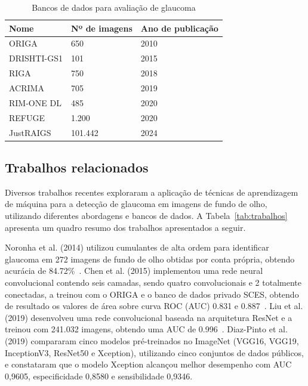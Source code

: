 \documentclass[12pt]{article}
\begin{document}
\begin{table}[htb]
    \centering
    \begin{tabularx}{\textwidth}{XXX}
    \toprule
    \textbf{Nome} & \textbf{Nº de imagens} & \textbf{Ano de publicação} \\
    \midrule
    ORIGA & 650 & 2010 \\
    DRISHTI-GS1 & 101 & 2015 \\
    RIGA & 750 & 2018 \\
    ACRIMA & 705 & 2019 \\
    RIM-ONE DL & 485 & 2020 \\
    REFUGE & 1.200 & 2020 \\
    JustRAIGS & 101.442 & 2024 \\
    \bottomrule
    \end{tabularx}
    \caption{Bancos de dados para avaliação de glaucoma}
    \label{tab:datasets}
\end{table}

\subsection{Trabalhos relacionados}
\label{sec:review:related}

Diversos trabalhos recentes exploraram a aplicação de técnicas de aprendizagem de máquina para a detecção de glaucoma em imagens de fundo de olho, utilizando diferentes abordagens e bancos de dados. A Tabela~\ref{tab:trabalhos} apresenta um quadro resumo dos trabalhos apresentados a seguir.

Noronha et al. (2014) utilizou cumulantes de alta ordem para identificar glaucoma em 272 imagens de fundo de olho obtidas por conta própria, obtendo acurácia de 84.72\%~\cite{noronha2014hoc}. Chen et al. (2015) implementou uma rede neural convolucional contendo seis camadas, sendo quatro convolucionais e 2 totalmente conectadas, a treinou com o ORIGA e o banco de dados privado SCES, obtendo de resultado os valores de área sobre curva ROC (AUC) 0.831 e 0.887~\cite{chen2015cnn}. Liu et al. (2019) desenvolveu uma rede convolucional baseada na arquitetura ResNet e a treinou com 241.032 imagens, obtendo uma AUC de 0.996~\cite{liu_cnn_2019}. Diaz-Pinto et al. (2019) compararam cinco modelos pré-treinados no ImageNet (VGG16, VGG19, InceptionV3, ResNet50 e Xception), utilizando cinco conjuntos de dados públicos, e constataram que o modelo Xception alcançou melhor desempenho com AUC 0,9605, especificidade 0,8580 e sensibilidade 0,9346.
\end{document}
